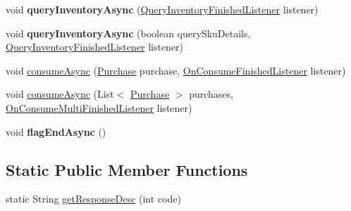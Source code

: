 \begin{DoxyCompactItemize}
\item 
\mbox{\label{classorg_1_1cocos2dx_1_1plugin_1_1util_1_1IabHelper_a758557b230d10e41259ae40aefba251d}} 
void {\bfseries query\+Inventory\+Async} (\hyperlink{interfaceorg_1_1cocos2dx_1_1plugin_1_1util_1_1IabHelper_1_1QueryInventoryFinishedListener}{Query\+Inventory\+Finished\+Listener} listener)
\item 
\mbox{\label{classorg_1_1cocos2dx_1_1plugin_1_1util_1_1IabHelper_af32decea956399bb88c14f631cc66e20}} 
void {\bfseries query\+Inventory\+Async} (boolean query\+Sku\+Details, \hyperlink{interfaceorg_1_1cocos2dx_1_1plugin_1_1util_1_1IabHelper_1_1QueryInventoryFinishedListener}{Query\+Inventory\+Finished\+Listener} listener)
\item 
void \hyperlink{classorg_1_1cocos2dx_1_1plugin_1_1util_1_1IabHelper_aebe7d5a554683f1d09ef7bdc19d6046e}{consume\+Async} (\hyperlink{classorg_1_1cocos2dx_1_1plugin_1_1util_1_1Purchase}{Purchase} purchase, \hyperlink{interfaceorg_1_1cocos2dx_1_1plugin_1_1util_1_1IabHelper_1_1OnConsumeFinishedListener}{On\+Consume\+Finished\+Listener} listener)
\item 
void \hyperlink{classorg_1_1cocos2dx_1_1plugin_1_1util_1_1IabHelper_a347fa3413cc9fe458d47a82f5f651c73}{consume\+Async} (List$<$ \hyperlink{classorg_1_1cocos2dx_1_1plugin_1_1util_1_1Purchase}{Purchase} $>$ purchases, \hyperlink{interfaceorg_1_1cocos2dx_1_1plugin_1_1util_1_1IabHelper_1_1OnConsumeMultiFinishedListener}{On\+Consume\+Multi\+Finished\+Listener} listener)
\item 
\mbox{\label{classorg_1_1cocos2dx_1_1plugin_1_1util_1_1IabHelper_a3e2b5a32fbb6ca1d76a87a4f7ce58daa}} 
void {\bfseries flag\+End\+Async} ()
\end{DoxyCompactItemize}
\subsection*{Static Public Member Functions}
\begin{DoxyCompactItemize}
\item 
static String \hyperlink{classorg_1_1cocos2dx_1_1plugin_1_1util_1_1IabHelper_a96fb9ce0f62a2601f6ee158ec45a96d5}{get\+Response\+Desc} (int code)
\end{DoxyCompactItemize}
